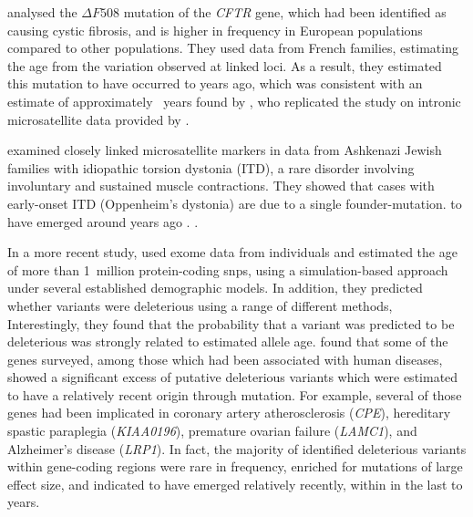  analysed the ${\Delta{F508}}$ mutation of the \textsl{CFTR} gene, which had been identified as causing cystic fibrosis, and is higher in frequency in European populations compared to other populations.
They used  data from  French families, estimating the age from the variation observed at  linked loci.
As a result, they estimated this mutation to have occurred  to  years ago, which was consistent with an estimate of approximately ~years found by \citet{Slatkin:2000us}, who replicated the study on intronic microsatellite data provided by \citet{Morral:1994vx}.

 examined  closely linked microsatellite markers in data from  Ashkenazi Jewish families with idiopathic torsion dystonia (ITD), a rare disorder involving involuntary and sustained muscle contractions.
They showed that cases with early-onset ITD (Oppenheim's dystonia) are due to a single founder-mutation.
 to have emerged around  years ago .
\citet{labuda1996linkage}\citet{Risch:1995ir}\citet{Slatkin:2000us}.


In a more recent study, \citet{Fu:2012hg} used exome data from  individuals and estimated the age of more than 1~million protein-coding \glspl{snp}, using a simulation-based approach under several established demographic models.
In addition, they predicted whether variants were deleterious using a range of different methods, Interestingly, they found that the probability that a variant was predicted to be deleterious was strongly related to estimated allele age.
 found that some of the genes surveyed, among those which had been associated with human diseases, showed a significant excess of putative deleterious variants which were estimated to have a relatively recent origin through mutation.
For example, several of those genes had been implicated in coronary artery atherosclerosis (\textsl{CPE}), hereditary spastic paraplegia (\textsl{KIAA0196}), premature ovarian failure (\textsl{LAMC1}), and Alzheimer's disease (\textsl{LRP1}).
In fact, the majority of identified deleterious variants within gene-coding regions were rare in frequency, enriched for mutations of large effect size, and indicated to have emerged relatively recently, within in the last  to  years.

